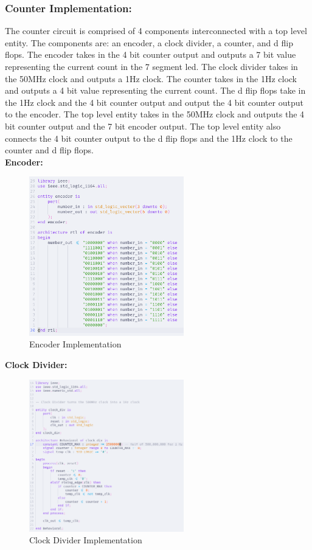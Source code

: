 \documentclass{article}
\begin{document}
\subsubsection*{Counter Implementation:}
The counter circuit is comprised of 4 components interconnected with a top level entity. The components are: an encoder, a clock divider, a counter, and d flip flops. The encoder takes in the 4 bit counter output and outputs a 7 bit value representing the current count in the 7 segment led. The clock divider takes in the 50MHz clock and outputs a 1Hz clock. The counter takes in the 1Hz clock and outputs a 4 bit value representing the current count. The d flip flops take in the 1Hz clock and the 4 bit counter output and output the 4 bit counter output to the encoder. The top level entity takes in the 50MHz clock and outputs the 4 bit counter output and the 7 bit encoder output. The top level entity also connects the 4 bit counter output to the d flip flops and the 1Hz clock to the counter and d flip flops. \\
\textbf{Encoder:} \\
\begin{figure}[H]
  \centering
  \includegraphics[width=0.6\textwidth]{encoder.png}
  \caption{Encoder Implementation}
\end{figure}
\textbf{Clock Divider:} \\
\begin{figure}[H]
  \centering
  \includegraphics[width=0.6\textwidth]{clock_div.png}
  \caption{Clock Divider Implementation}
\end{figure}
\end{document}

